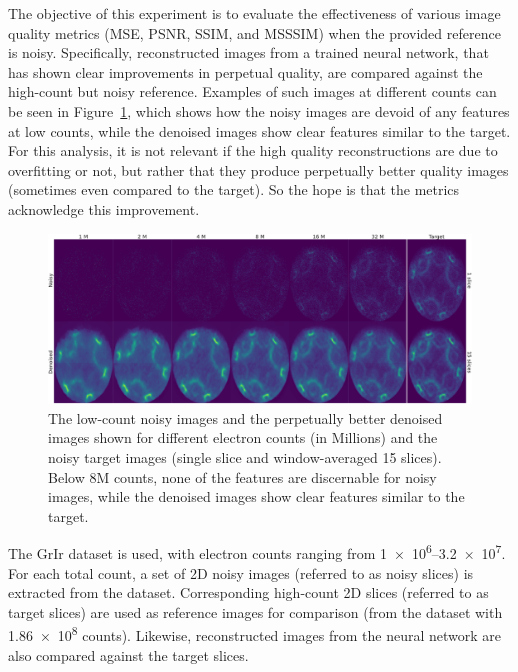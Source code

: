 The objective of this experiment is to evaluate the effectiveness of various image quality metrics (\gls{MSE}, \gls{PSNR}, \gls{SSIM}, and \gls{MSSSIM}) when the provided reference is noisy. Specifically, reconstructed images from a trained neural network, that has shown clear improvements in perpetual quality, are compared against the high-count but noisy reference. Examples of such images at different counts can be seen in Figure~\ref{fig:images-noisy-denoised}, which shows how the noisy images are devoid of any features at low counts, while the denoised images show clear features similar to the target. For this analysis, it is not relevant if the high quality reconstructions are due to overfitting or not, but rather that they produce perpetually better quality images (sometimes even compared to the target). So the hope is that the metrics acknowledge this improvement.

\begin{figure}[h]
    \centering
    \includegraphics[width=1\linewidth]{images/images_noisy_denoised_with_target.pdf}
    \caption{The low-count noisy images and the perpetually better denoised images shown for different electron counts (in Millions) and the noisy target images (single slice and window-averaged 15 slices). Below \num{8}M counts, none of the features are discernable for noisy images, while the denoised images show clear features similar to the target.}
    \label{fig:images-noisy-denoised}
\end{figure}

The \gls{GrIr} dataset is used, with electron counts ranging from \numrange{1e6}{3.2e7}. For each total count, a set of 2D noisy images (referred to as noisy slices) is extracted from the dataset. Corresponding high-count 2D slices (referred to as target slices) are used as reference images for comparison (from the dataset with \num{1.86e8} counts). Likewise, reconstructed images from the neural network are also compared against the target slices.

